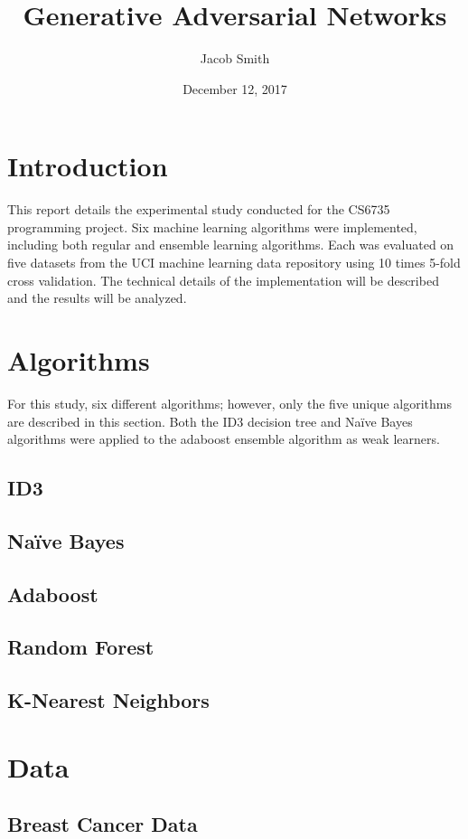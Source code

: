 \documentclass[11pt]{article}
\title{Generative Adversarial Networks}
\author{Jacob Smith}
\date{December 12, 2017}
\begin{document}
\maketitle

\section{Introduction}
This report details the experimental study conducted for the CS6735 programming project. Six machine learning algorithms were implemented, including both regular and ensemble learning algorithms. Each was evaluated on five datasets from the UCI machine learning data repository using 10 times 5-fold cross validation. The technical details of the implementation will be described and the results will be analyzed.

\section{Algorithms}
For this study, six different algorithms; however, only the five unique algorithms are described in this section. Both the ID3 decision tree and Naïve Bayes algorithms were applied to the adaboost ensemble algorithm as weak learners.

\subsection{ID3}
\subsection{Naïve Bayes}
\subsection{Adaboost}
\subsection{Random Forest}
\subsection{K-Nearest Neighbors}

\section{Data}
\subsection{Breast Cancer Data}
\end{document}
